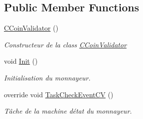 \subsection*{Public Member Functions}
\begin{DoxyCompactItemize}
\item 
\mbox{\hyperlink{class_device_library_1_1_c_coin_validator_addb8e79d5a3377a2aadef60fc1b19a53}{C\+Coin\+Validator}} ()
\begin{DoxyCompactList}\small\item\em Constructeur de la class \mbox{\hyperlink{class_device_library_1_1_c_coin_validator}{C\+Coin\+Validator}} \end{DoxyCompactList}\item 
void \mbox{\hyperlink{class_device_library_1_1_c_coin_validator_a274bb7c7d9bfe3d07beff3e3f3553de8}{Init}} ()
\begin{DoxyCompactList}\small\item\em Initialisation du monnayeur. \end{DoxyCompactList}\item 
override void \mbox{\hyperlink{class_device_library_1_1_c_coin_validator_a0e406f9e175eb8d295fe7406e6a948af}{Task\+Check\+Event\+CV}} ()
\begin{DoxyCompactList}\small\item\em Tâche de la machine d\textquotesingle{}état du monnayeur. \end{DoxyCompactList}\end{DoxyCompactItemize}
